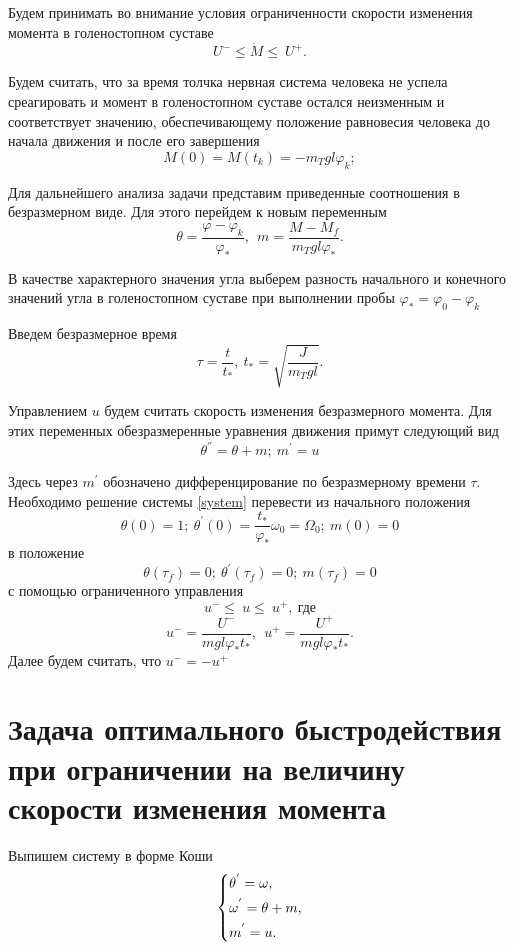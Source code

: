 \documentclass[a4paper,14pt]{article}
\theoremstyle{plain} %
\theoremstyle{definition} %
\theoremstyle{remark} %
\begin{document}
{Будем принимать во внимание условия ограниченности скорости изменения
момента в голеностопном суставе
\[
    U^-\leqslant\dot{M}\leqslant\ U^+.
\]

Будем считать, что за время толчка нервная система человека
не успела среагировать и момент в голеностопном суставе остался
неизменным и соответствует значению, обеспечивающему положение
равновесия человека до начала движения и после его завершения
\[
    M(0)=M\left(t_k\right)=-m_Tgl\varphi_k;
\]

Для дальнейшего анализа задачи представим приведенные
соотношения в безразмерном виде. Для этого перейдем
к новым переменным
\[
    \theta=\frac{\varphi-\varphi_k}{\varphi_\ast},\ \ m=\frac{M-M_f}{m_Tgl\varphi_\ast}.
\]

В качестве характерного значения угла выберем разность
начального и конечного значений угла в голеностопном
суставе при выполнении пробы $\varphi_\ast=\varphi_0-\varphi_k$

Введем безразмерное время
\[
    \tau=\frac{t}{t_\ast},\ t_\ast=\sqrt{\frac{J}{m_Tgl}}.
\]

Управлением $u$ будем считать скорость изменения безразмерного
момента. Для этих переменных обезразмеренные уравнения движения
примут следующий вид
\begin{equation}\label{system}
    \theta^{''}=\theta+m;\ m^{'}=u
\end{equation}

Здесь через $m^{'}$ обозначено дифференцирование по
безразмерному времени $\tau$. Необходимо решение системы \eqref{system}
перевести из начального положения
\[
    \theta(0)=1;\ \theta^{'}(0)=\frac{t_\ast}{\varphi_\ast}\omega_0=\Omega_0;\ m(0)=0
\]
в положение
\[
    \theta(\tau_f)=0;\ \theta^{'}(\tau_f)=0;\ m(\tau_f)=0
\]
с помощью ограниченного управления
\[
    u^-\leqslant\ u\leqslant\ u^+,\ \text{где}
\]
\[
    u^-=\frac{U^-}{mgl\varphi_\ast t_\ast},\ \ u^+=\frac{U^+}{mgl\varphi_\ast t_\ast}.
\]
Далее будем считать, что $u^-=-u^+$
\newpage
\section{Задача оптимального быстродействия при ограничении на величину скорости изменения момента}
Выпишем систему в форме Коши
\begin{equation}\label{koshisystem}
    \left\{ {\begin{aligned}
                 & \theta^{'} = \omega , \hfill   \\
                 & \omega^{'} = \theta+m , \hfill \\
                 & m^{'} = u . \hfill             \\
            \end{aligned}} \right.
\end{equation}

}
\end{document}
